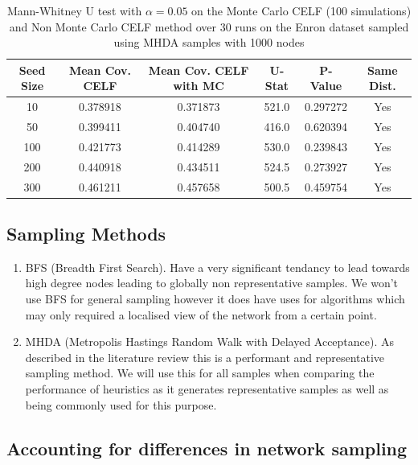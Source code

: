 \documentclass{article}
\begin{document}
\begin{table}[h]
	\centering
	\begin{tabular}{|c|c|c|c|c|c|}
		\hline
		Seed Size & Mean Cov. CELF & Mean Cov. CELF with MC & U-Stat & P-Value  & Same Dist. \\
		\hline
		10        & 0.378918       & 0.371873               & 521.0  & 0.297272 & Yes        \\
		50        & 0.399411       & 0.404740               & 416.0  & 0.620394 & Yes        \\
		100       & 0.421773       & 0.414289               & 530.0  & 0.239843 & Yes        \\
		200       & 0.440918       & 0.434511               & 524.5  & 0.273927 & Yes        \\
		300       & 0.461211       & 0.457658               & 500.5  & 0.459754 & Yes        \\
		\hline
	\end{tabular}
	\caption{Mann-Whitney U test with $\alpha=0.05$ on the Monte Carlo CELF (100 simulations) and Non Monte Carlo CELF method over 30 runs on the Enron dataset sampled using MHDA  samples with 1000 nodes}
\end{table}

\subsection{Sampling Methods}

\begin{enumerate}
	\item BFS (Breadth First Search). Have a very significant tendancy to lead towards high degree nodes leading to globally non representative samples. We won't use BFS for general sampling however it does have uses for algorithms which may only required a localised view of the network from a certain point.
	\item MHDA (Metropolis Hastings Random Walk with Delayed Acceptance). As described in the literature review this is a performant and representative sampling method. We will use this for all samples when comparing the performance of heuristics as it generates representative samples as well as being commonly used for this purpose.
\end{enumerate}

\subsection{Accounting for differences in network sampling}
\end{document}
